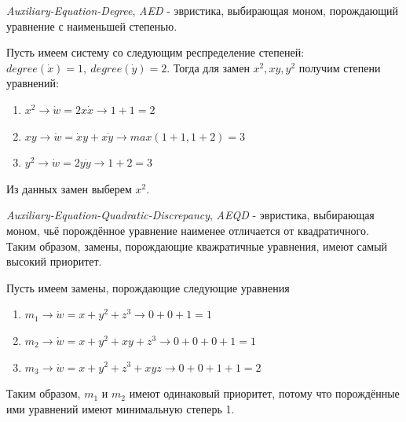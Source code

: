 \begin{heuristics} \label{heur:AED}
    \textit{Auxiliary-Equation-Degree}, \textit{AED} - эвристика, выбирающая моном, порождающий уравнение с наименьшей степенью. 
    
    \begin{example}
        Пусть имеем систему со следующим респределение степеней: $degree(\dot x) = 1,\ degree(\dot y) = 2$. Тогда для замен $x^2, xy, y^2$ получим степени уравнений:
        \begin{enumerate}
            \item $x^2 \longrightarrow \dot w = 2x \dot x \longrightarrow 1 + 1 = 2$
            \item $xy \longrightarrow \dot w = \dot x y + x \dot y \longrightarrow max(1 + 1, 1 + 2) = 3$
            \item $y^2 \longrightarrow \dot w = 2y \dot y \longrightarrow 1 + 2 = 3$
        \end{enumerate}
        Из данных замен выберем $x^2$.
    \end{example}
\end{heuristics}

\begin{heuristics} \label{heur:AEQD}
    \textit{Auxiliary-Equation-Quadratic-Discrepancy}, \textit{AEQD} - эвристика, выбирающая моном, чьё порождённое уравнение наименее отличается от квадратичного. Таким образом, замены, порождающие кважратичные уравнения, имеют самый высокий приоритет. 
    
    \begin{example}
        Пусть имеем замены, порождающие следующие уравнения
        \begin{enumerate}
            \item $m_1 \longrightarrow \dot w = x + y^2 + z^3 \longrightarrow 0 + 0 + 1 = 1$
            \item $m_2 \longrightarrow \dot w = x + y^2 + xy + z^3 \longrightarrow 0 + 0 + 0 + 1 = 1$
            \item $m_3 \longrightarrow \dot w = x + y^2 + z^3 + xyz \longrightarrow 0 + 0 +1 + 1 = 2$
        \end{enumerate}
        Таким образом, $m_1$ и $m_2$ имеют одинаковый приоритет, потому что порождённые ими уравнений имеют минимальную степерь 1.
    \end{example}
\end{heuristics}


